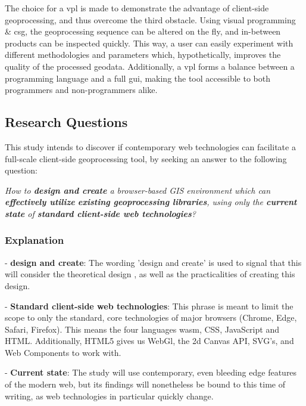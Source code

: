 The choice for a \ac{vpl} is made to demonstrate the advantage of client-side geoprocessing, and thus overcome the third obstacle. 
Using visual programming \& \ac{csg}, the geoprocessing sequence can be altered on the fly, and in-between products can be inspected quickly. 
This way, a user can easily experiment with different methodologies and parameters which, hypothetically, improves the quality of the processed geodata.
Additionally, a \ac{vpl} forms a balance between a programming language and a full \ac{gui}, making the tool accessible to both programmers and non-programmers alike.


\newpage
\subsection{Research Questions}

This study intends to discover if contemporary web technologies can facilitate a full-scale client-side geoprocessing tool, by seeking an answer to the following question: 

\textit{How to \textbf{design and create} a browser-based GIS environment which can \textbf{effectively utilize} \textbf{existing geoprocessing libraries}, using only the \textbf{current state} of \textbf{standard client-side web technologies}?}

\subsubsection*{Explanation}


- \textbf{design and create}: The wording 'design and create' is used to signal that this will consider the theoretical design , as well as the practicalities of creating this design. 

- \textbf{Standard client-side web technologies}: This phrase is meant to limit the scope to only the standard, core technologies of major browsers (Chrome, Edge, Safari, Firefox). This means the four languages \ac{wasm}, CSS, JavaScript and HTML. Additionally, HTML5 gives us WebGl, the 2d Canvas API, SVG's, and Web Components to work with.

- \textbf{Current state}: The study will use contemporary, even bleeding edge features of the modern web, but its findings will nonetheless be bound to this time of writing, as web technologies in particular quickly change. 

